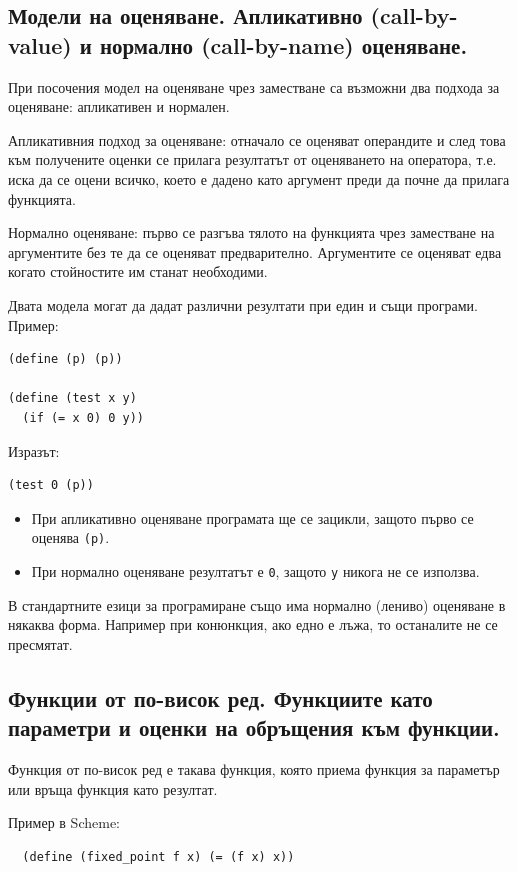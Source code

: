 \documentclass{article}
\renewcommand{\\}{\newline}
\begin{document}
\subsection{Модели на оценяване. Апликативно (call-by-value) и нормално (call-by-name) оценяване.}


При посочения модел на оценяване чрез заместване са възможни два подхода за оценяване: апликативен и нормален.

Апликативния подход за оценяване: отначало се оценяват операндите и след това към получените оценки се прилага резултатът от оценяването на оператора, т.е. иска да се оцени всичко, което е дадено като аргумент преди да почне да прилага функцията.

Нормално оценяване: първо се разгъва тялото на функцията чрез заместване на аргументите без те да се оценяват предварително. Аргументите се оценяват едва когато стойностите им станат необходими.

Двата модела могат да дадат различни резултати при един и същи програми.
Пример:
\begin{lstlisting}
(define (p) (p))

(define (test x y)
  (if (= x 0) 0 y))
\end{lstlisting}

Изразът:
\begin{lstlisting}
(test 0 (p))
\end{lstlisting}

\begin{itemize}
    \item При апликативно оценяване програмата ще се зацикли, защото първо се оценява \texttt{(p)}.
    \item При нормално оценяване резултатът е \texttt{0}, защото \texttt{y} никога не се използва.
\end{itemize}

В стандартните езици за програмиране също има нормално (лениво) оценяване в някаква форма. Например при конюнкция, ако едно е лъжа, то останалите не се пресмятат.

\subsection{Функции от по-висок ред. Функциите като параметри и оценки на обръщения към функции.}

Функция от по-висок ред е такава функция, която приема функция за параметър или връща функция като резултат.

Пример в Scheme:
\begin{lstlisting}
  (define (fixed_point f x) (= (f x) x))
\end{lstlisting}
\end{document}
